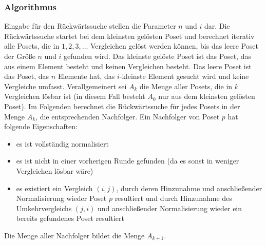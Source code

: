 \documentclass[10pt,journal,compsoc]{IEEEtran}
\begin{document}
\subsubsection{Algorithmus}
Eingabe für den Rückwärtssuche stellen die Parameter $n$ und $i$ dar.
Die Rückwärtssuche startet bei dem kleinsten gelösten Poset und berechnet iterativ alle Posets, die in $1, 2, 3, \dots$ Vergleichen gelöst werden können, bis das leere Poset der Größe $n$ und $i$ gefunden wird.
Das kleinste gelöste Poset ist das Poset, das aus einem Element besteht und keinen Vergleichen besteht.
Das leere Poset ist das Poset, das $n$ Elemente hat, das $i$-kleinste Element gesucht wird und keine Vergleiche umfasst.
Verallgemeinert sei $A_k$ die Menge aller Posets, die in $k$ Vergleichen lösbar ist (in diesem Fall besteht $A_0$ nur aus dem kleinsten gelösten Poset).
Im Folgenden berechnet die Rückwärtssuche für jedes Posets in der Menge $A_k$, die entsprechenden Nachfolger.
Ein Nachfolger von Poset $p$ hat folgende Eigenschaften:
\begin{itemize}
  \item es ist vollständig normalisiert
  \item es ist nicht in einer vorherigen Runde gefunden (da es sonst in weniger Vergleichen lösbar wäre)
  \item es existiert ein Vergleich $(i, j)$, durch deren Hinzunahme und anschließender Normalisierung wieder Poset $p$ resultiert und durch Hinzunahme des Umkehrvergleichs $(j, i)$ und anschließender Normalisierung wieder ein bereits gefundenes Poset resultiert
\end{itemize}
Die Menge aller Nachfolger bildet die Menge $A_{k + 1}$.
\end{document}

